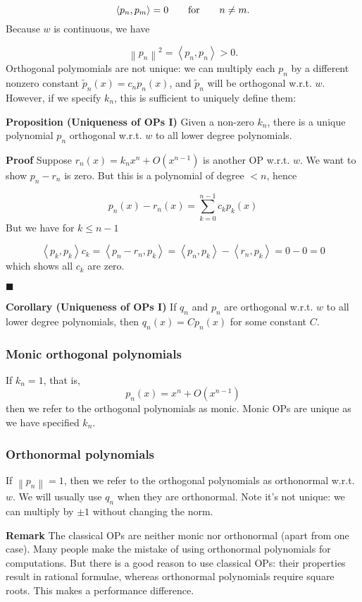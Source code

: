 \documentclass[12pt,landscape]{article}
\def\qqfor{\qquad\hbox{for}\qquad}
\def\ip<#1>{\left\langle{#1}\right\rangle}
\def\norm#1{\left\| #1 \right\|}
\begin{document}
{\[
\ip<p_n,p_m> = 0\qqfor n \neq m.
\]
Because $w$ is continuous, we have

\[
\norm{p_n}^2 = \ip<p_n,p_n> > 0 .
\]
Orthogonal polymomials are not unique: we can multiply each $p_n$ by a different nonzero constant $\tilde p_n(x) = c_n p_n(x)$, and $\tilde p_n$ will be orthogonal w.r.t. $w$.  However, if we specify $k_n$, this is sufficient to uniquely define them:

\textbf{Proposition (Uniqueness of OPs I)} Given a non-zero $k_n$, there is a unique polynomial $p_n$ orthogonal w.r.t. $w$ to all lower degree polynomials.

\textbf{Proof} Suppose $r_n(x) = k_n x^n + O(x^{n-1})$ is another  OP w.r.t. $w$. We want to show $p_n - r_n$ is zero. But this is a polynomial of degree $<n$, hence

\[
p_n(x) - r_n(x) = \sum_{k=0}^{n-1} c_k p_k(x)
\]
But we have for $k \leq n-1$

\[
\ip<p_k,p_k> c_k = \ip<p_n - r_n, p_k> = \ip<p_n,p_k> - \ip<r_n, p_k> = 0 - 0 = 0
\]
which shows all $c_k$ are zero.

\ensuremath{\blacksquare}

\textbf{Corollary (Uniqueness of OPs I)} If $q_n$ and $p_n$ are orthogonal w.r.t. $w$ to all lower degree polynomials, then $q_n(x) = C p_n(x)$ for some constant $C$.
\newpage
\subsubsection{Monic orthogonal polynomials}
If $k_n = 1$, that is,
\[
p_n(x) = x^n + O(x^{n-1})
\]
then we refer to the orthogonal polynomials as monic. Monic OPs are unique as we have specified $k_n$.

\subsubsection{Orthonormal polynomials}
If  $\norm{p_n} = 1$, then we refer to the orthogonal polynomials as orthonormal w.r.t. $w$. We will usually use $q_n$ when they are orthonormal.   Note it's not unique: we can multiply by $\pm 1$ without changing the norm.

\textbf{Remark} The classical OPs are neither monic nor orthonormal (apart from one case). Many people make the mistake of using orthonormal polynomials for computations. But there is a good reason to use classical OPs: their properties result in rational formulae, whereas orthonormal polynomials require square roots. This makes a performance difference.
\newpage
}
\end{document}
